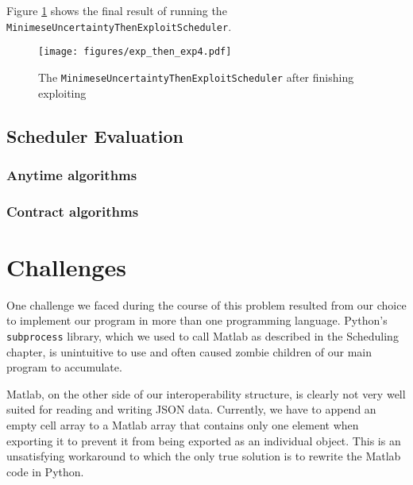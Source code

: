 \documentclass[a4paper,12pt,twoside,openright]{report}
\begin{document}
Figure \ref{sched:exp_then_exp4} shows the final result of running the \texttt{MinimeseUncertaintyThenExploitScheduler}. %

\begin{figure}
\centering
  \texttt{[image: figures/exp\_then\_exp4.pdf]}
  \caption{The \texttt{MinimeseUncertaintyThenExploitScheduler} after finishing exploiting}
  \label{sched:exp_then_exp4}
\end{figure}

\subsection{Scheduler Evaluation}

\subsubsection{Anytime algorithms}

\subsubsection{Contract algorithms}





\section{Challenges}
One challenge we faced during the course of this problem resulted from our choice to implement our program in more than one programming language. Python's \texttt{subprocess} library, which we used to call Matlab as described in the Scheduling chapter, is unintuitive to use and often caused zombie children of our main program to accumulate. 

Matlab, on the other side of our interoperability structure, is clearly not very well suited for reading and writing JSON data. Currently, we have to append an empty cell array to a Matlab array that contains only one element when exporting it to prevent it from being exported as an individual object. This is an unsatisfying workaround to which the only true solution is to rewrite the Matlab code in Python.
\end{document}
